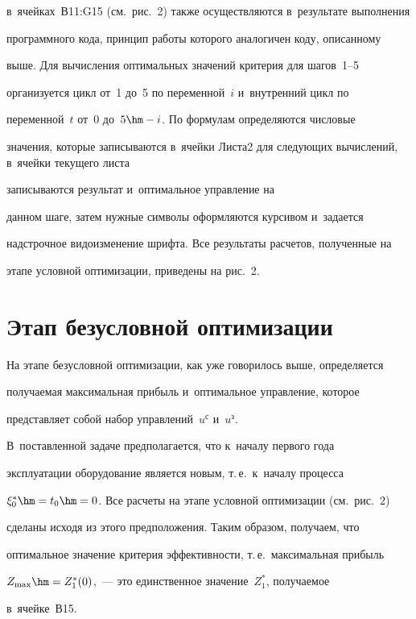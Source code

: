 в~ячейках~В11:G15 (см.\ рис.~2) также осуществляются в~результате выполнения 


программного кода, принцип работы которого аналогичен коду, описанному 


выше. Для вычисления оптимальных значений критерия для шагов~1--5 


организуется цикл от~1 до~5 по переменной~$i$ и~внут\-рен\-ний цикл по 


переменной~$t$ от~0 до~$5\hm- i$. По формулам определяются чис\-ло\-вые 


значения, которые записываются в~ячейки Листа2 для следующих вычислений, в~ячейки текущего листа 


записываются результат и~оптимальное управление на 


данном шаге, затем нужные символы оформляются курсивом и~задается 


надстрочное видоизменение шриф\-та. Все результаты расчетов, полученные на 


этапе условной оптимизации, приведены на рис.~2.


  


\section{Этап безусловной оптимизации}





  На этапе безусловной оптимизации, как уже говорилось выше, определяется 


получаемая максимальная прибыль и~оптимальное управление, которое 


пред\-став\-ля\-ет собой набор управлений~$u^{\mathrm{с}}$ и~$ u^{\mathrm{з}}$. 


В~по\-став\-лен\-ной задаче предполагается, что к~началу первого года 


эксплуатации оборудование является новым, т.\,е.\ к~началу процесса 


$\xi_0^*\hm = t_0 \hm= 0$. Все расчеты на этапе услов\-ной оптимизации (см.\ рис.~2) 


сделаны исходя из этого предположения. Таким образом, получаем, что 


оптимальное значение критерия эффективности, т.\,е.\ максимальная прибыль 


$Z_{\max}\hm = Z^*_1(0)$,~--- это единственное значение~$Z_1^*$, по\-лу\-ча\-емое 


в~ячейке~В15.


